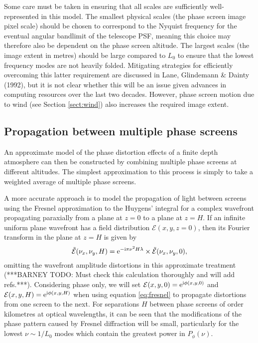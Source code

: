\documentclass[preprint]{aastex}
\begin{document}
Some care must be taken in ensuring that
all scales are sufficiently well-represented in this model. The
smallest physical scales (the phase screen image pixel scale) should be chosen to
correspond to the Nyquist frequency for the eventual
angular bandlimit of the telescope PSF, meaning this choice may
therefore also be dependent on the phase screen altitude.
The largest scales (the image extent in metres) should be large
compared to $L_0$ to ensure that the lowest frequency modes are not
heavily folded.  Mitigating strategies for efficiently overcoming this
latter requirement are discussed in Lane, Glindemann \& Dainty (1992),
but it is not clear whether this will be an issue given advances in
computing resources over the last two decades.  However, phase screen
motion due to wind (see Section \ref{sect:wind}) also increases the required
image extent.


\subsection{Propagation between multiple phase screens}
An approximate model of the phase distortion effects of a finite depth
atmosphere can then be constructed by combining multiple phase screens at different
altitudes.  The simplest approximation to this process is simply to
take a weighted average of multiple phase screens.

A more accurate approach is to model the propagation of light between
screens using the Fresnel approximation to the Huygens' integral for a
complex wavefront propagating paraxially from a plane at $z=0$ to a
plane at $z=H$.  If an infinite uniform plane wavefront has a field
distribution $\mathcal{E}(x, y, z=0)$, then its Fourier
transform in the plane at $z=H$ is given by
\begin{equation}\label{eq:fresnel}
\tilde{\mathcal{E}}(\nu_x, \nu_y, H) = {\rm e}^{-{\rm i} \pi \nu^2  H
  \lambda} \times \tilde{\mathcal{E}}(\nu_x, \nu_y, 0),
\end{equation}
omitting the wavefront amplitude distortions in this approximate
treatment (***BARNEY TODO: Must check this calculation thoroughly and
will add refs.***).   Considering phase only, we will
set $\mathcal{E}(x, y, 0) = {\rm e}^{{\rm i}\phi(x, y, 0)}$ and
$\mathcal{E}(x, y, H) = {\rm e}^{{\rm i}\phi(x, y, H)}$ when using
equation \eqref{eq:fresnel} to propagate distortions from one
screen to the next.
For separations $H$ between phase screens
of order kilometres at optical wavelengths, it can be seen that the modifications of the phase pattern
caused by Fresnel diffraction will be small, particularly for the
lowest $\nu \sim 1/L_0$ modes which contain the greatest power in $P_{\phi}(\nu)$.
\end{document}

